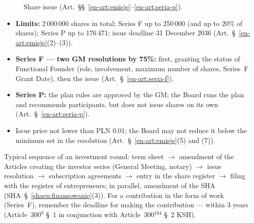 \documentclass[11pt,a4paper]{report}
\begin{document}
\begin{figure}[H]
\centering
{}
\caption{Share issue (Art.~\S\S~\ref{en-art:emisje}--\ref{en-art:seria-p}).}
\end{figure}

\begin{itemize}
  \item \textbf{Limits:} 2\,000\,000 shares in total; Series F up to 250\,000 (and up to 20\% of shares); Series P up to 176\,471; issue deadline 31 December 2036 (Art.~\S~\ref{en-art:emisje}(2)--(3)).
  \item \textbf{Series F --- two GM resolutions by 75\%:} first, granting the status of Functional Founder (role, involvement, maximum number of shares, Series~F Grant Date), then the issue (Art.~\S~\ref{en-art:seria-f}).
  \item \textbf{Series P:} the plan rules are approved by the GM; the Board runs the plan and recommends participants, but does not issue shares on its own (Art.~\S~\ref{en-art:seria-p}).
  \item Issue price not lower than PLN 0.01; the Board may not reduce it below the minimum set in the resolution (Art.~\S~\ref{en-art:emisje}(5) and (7)).
\end{itemize}

\begin{Komentarz}
Typical sequence of an investment round: term sheet $\to$ amendment of the Articles creating the investor series (General Meeting, notary) $\to$ issue resolution $\to$ subscription agreements $\to$ entry in the share register $\to$ filing with the register of entrepreneurs; in parallel, amendment of the SHA (SHA~\S~\ref{shaen:finansowanie}(3)). For a contribution in the form of work (Series~F), remember the deadline for making the contribution --- within 3 years (Article~300$^{9}$ \S~1 in conjunction with Article~300$^{104}$ \S~2 KSH).
\end{Komentarz}
\end{document}
